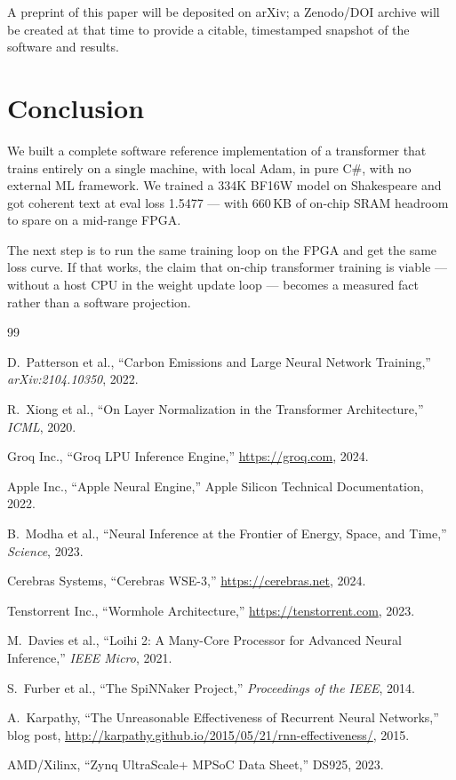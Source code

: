 \documentclass[11pt]{article}
\newcommand{\cpubfvaloss}{1.5477}
\begin{document}
A preprint of this paper will be deposited on arXiv; a Zenodo/DOI archive will be
created at that time to provide a citable, timestamped snapshot of the software and results.

\section{Conclusion}

We built a complete software reference implementation of a transformer that trains
entirely on a single machine, with local Adam, in pure C\#, with no external ML
framework. We trained a 334K BF16W model on Shakespeare and got coherent text at
eval loss \cpubfvaloss{} --- with 660\,KB of on-chip SRAM headroom to spare on a mid-range FPGA.

The next step is to run the same training loop on the FPGA and get the same loss curve.
If that works, the claim that on-chip transformer training is viable --- without a host
CPU in the weight update loop --- becomes a measured fact rather than a software projection.

\begin{thebibliography}{99}

D.~Patterson et al., ``Carbon Emissions and Large Neural Network Training,'' \emph{arXiv:2104.10350}, 2022.

R.~Xiong et al., ``On Layer Normalization in the Transformer Architecture,''
\emph{ICML}, 2020.

Groq Inc., ``Groq LPU Inference Engine,'' \url{https://groq.com}, 2024.

Apple Inc., ``Apple Neural Engine,'' Apple Silicon Technical Documentation, 2022.

B.~Modha et al., ``Neural Inference at the Frontier of Energy, Space, and Time,''
\emph{Science}, 2023.

Cerebras Systems, ``Cerebras WSE-3,'' \url{https://cerebras.net}, 2024.

Tenstorrent Inc., ``Wormhole Architecture,'' \url{https://tenstorrent.com}, 2023.

M.~Davies et al., ``Loihi 2: A Many-Core Processor for Advanced Neural Inference,''
\emph{IEEE Micro}, 2021.

S.~Furber et al., ``The SpiNNaker Project,'' \emph{Proceedings of the IEEE}, 2014.

A.~Karpathy, ``The Unreasonable Effectiveness of Recurrent Neural Networks,'' blog post,
\url{http://karpathy.github.io/2015/05/21/rnn-effectiveness/}, 2015.

AMD/Xilinx, ``Zynq UltraScale+ MPSoC Data Sheet,'' DS925, 2023.

\end{thebibliography}
\end{document}
